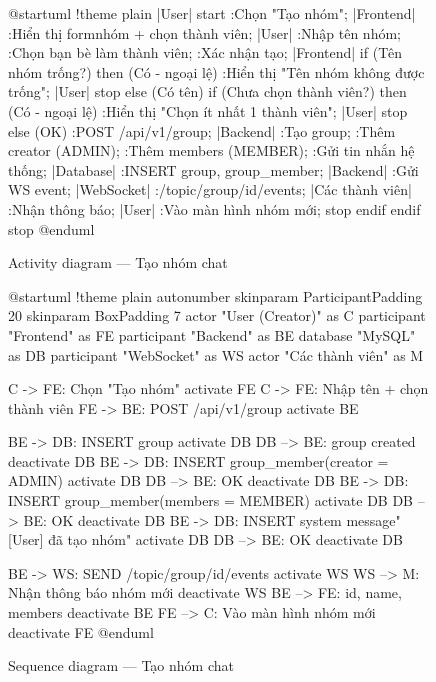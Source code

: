 \documentclass[12pt,a4paper]{report}
\begin{document}
\begin{figure}[H]
    \centering
    \begin{plantuml}
        @startuml
        !theme plain
        |User|
        start
        :Chọn "Tạo nhóm";
        |Frontend|
        :Hiển thị form nhóm + chọn thành viên;
        |User|
        :Nhập tên nhóm;
        :Chọn bạn bè làm thành viên;
        :Xác nhận tạo;
        |Frontend|
        if (Tên nhóm trống?) then (Có - ngoại lệ)
          :Hiển thị "Tên nhóm không được trống";
          |User|
          stop
        else (Có tên)
          if (Chưa chọn thành viên?) then (Có - ngoại lệ)
            :Hiển thị "Chọn ít nhất 1 thành viên";
            |User|
            stop
          else (OK)
            :POST /api/v1/group;
            |Backend|
            :Tạo group;
            :Thêm creator (ADMIN);
            :Thêm members (MEMBER);
            :Gửi tin nhắn hệ thống;
            |Database|
            :INSERT group, group_member;
            |Backend|
            :Gửi WS event;
            |WebSocket|
            :/topic/group/{id}/events;
            |Các thành viên|
            :Nhận thông báo;
            |User|
            :Vào màn hình nhóm mới;
            stop
          endif
        endif
        stop
        @enduml
    \end{plantuml}
    \caption{Activity diagram --- Tạo nhóm chat}
\end{figure}

\begin{figure}[H]
    \centering
    \begin{plantuml}
        @startuml
        !theme plain
        autonumber
        skinparam ParticipantPadding 20
        skinparam BoxPadding 7
        actor "User (Creator)" as C
        participant "Frontend" as FE
        participant "Backend" as BE
        database "MySQL" as DB
        participant "WebSocket" as WS
        actor "Các thành viên" as M

        C -> FE: Chọn "Tạo nhóm"
        activate FE
        C -> FE: Nhập tên + chọn thành viên
        FE -> BE: POST /api/v1/group 
        activate BE

        BE -> DB: INSERT group
        activate DB
        DB --> BE: group created
        deactivate DB
        BE -> DB: INSERT group_member\n(creator = ADMIN)
        activate DB
        DB --> BE: OK
        deactivate DB
        BE -> DB: INSERT group_member\n(members = MEMBER)
        activate DB
        DB --> BE: OK
        deactivate DB
        BE -> DB: INSERT system message\n"[User] đã tạo nhóm"
        activate DB
        DB --> BE: OK
        deactivate DB

        BE -> WS: SEND /topic/group/{id}/events
        activate WS
        WS --> M: Nhận thông báo nhóm mới
        deactivate WS
        BE --> FE: { id, name, members }
        deactivate BE
        FE --> C: Vào màn hình nhóm mới
        deactivate FE
        @enduml
    \end{plantuml}
    \caption{Sequence diagram --- Tạo nhóm chat}
\end{figure}
\end{document}
